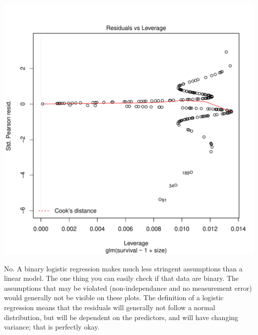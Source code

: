 \documentclass[12pt,a4paper]{scrartcl}\usepackage[]{graphicx}\usepackage[]{color}
\makeatletter
\def\maxwidth{ %
  \ifdim\Gin@nat@width>\linewidth
    \linewidth
  \else
    \Gin@nat@width
  \fi
}
\newenvironment{knitrout}{}{} %
\makeatother
\begin{document}
\begin{Answer}
\begin{knitrout}
\includegraphics[width=\maxwidth]{figure/unnamed-chunk-3-4} 

\end{knitrout}
No. A binary logistic regression makes much less stringent assumptions than a linear model. The one thing you can easily check if that data are binary. The assumptions that may be violated (non-independance and no measurement error) would generally not be visible on these plots. The definition of a logistic regression means that the residuals will generally not follow a normal distribution, but will be dependent on the predictors, and will have changing variance; that is perfectly okay.
\end{Answer}
\end{document}
